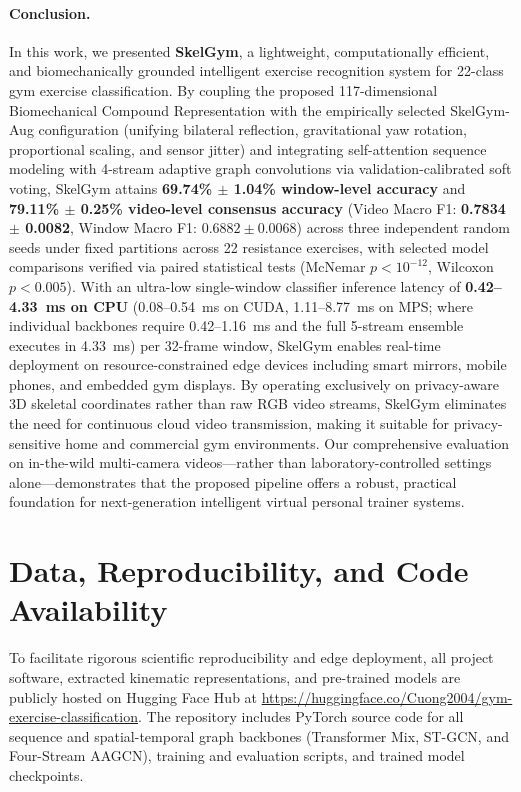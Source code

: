 \documentclass[preprint,12pt]{elsarticle}
\begin{document}
\paragraph{Conclusion.} In this work, we presented \textbf{SkelGym}, a lightweight, computationally efficient, and biomechanically grounded intelligent exercise recognition system for 22-class gym exercise classification. By coupling the proposed 117-dimensional Biomechanical Compound Representation with the empirically selected SkelGym-Aug configuration (unifying bilateral reflection, gravitational yaw rotation, proportional scaling, and sensor jitter) and integrating self-attention sequence modeling with 4-stream adaptive graph convolutions via validation-calibrated soft voting, SkelGym attains \textbf{69.74\% $\pm$ 1.04\% window-level accuracy} and \textbf{79.11\% $\pm$ 0.25\% video-level consensus accuracy} (Video Macro F1: \textbf{0.7834 $\pm$ 0.0082}, Window Macro F1: $0.6882 \pm 0.0068$) across three independent random seeds under fixed partitions across 22 resistance exercises, with selected model comparisons verified via paired statistical tests (McNemar $p < 10^{-12}$, Wilcoxon $p < 0.005$). With an ultra-low single-window classifier inference latency of \textbf{0.42--4.33~ms on CPU} (0.08--0.54~ms on CUDA, 1.11--8.77~ms on MPS; where individual backbones require 0.42--1.16~ms and the full 5-stream ensemble executes in 4.33~ms) per 32-frame window, SkelGym enables real-time deployment on resource-constrained edge devices including smart mirrors, mobile phones, and embedded gym displays. By operating exclusively on privacy-aware 3D skeletal coordinates rather than raw RGB video streams, SkelGym eliminates the need for continuous cloud video transmission, making it suitable for privacy-sensitive home and commercial gym environments. Our comprehensive evaluation on in-the-wild multi-camera videos---rather than laboratory-controlled settings alone---demonstrates that the proposed pipeline offers a robust, practical foundation for next-generation intelligent virtual personal trainer systems.

\section*{Data, Reproducibility, and Code Availability}
To facilitate rigorous scientific reproducibility and edge deployment, all project software, extracted kinematic representations, and pre-trained models are publicly hosted on Hugging Face Hub at \url{https://huggingface.co/Cuong2004/gym-exercise-classification}. The repository includes PyTorch source code for all sequence and spatial-temporal graph backbones (Transformer Mix, ST-GCN, and Four-Stream AAGCN), training and evaluation scripts, and trained model checkpoints. 
\end{document}
